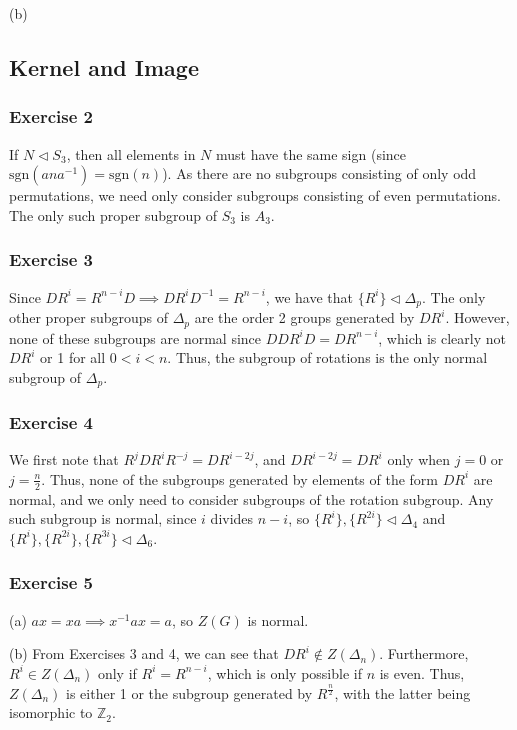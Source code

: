 (b) 

\subsection{Kernel and Image}

\subsubsection{Exercise 2}
If $N \triangleleft S_3$, then all elements in $N$ must have the same sign 
(since $\text{sgn}(ana^{-1}) = \text{sgn}(n)$). As there are no subgroups consisting of only odd 
permutations, we need only consider subgroups consisting of even permutations. The only such proper
subgroup of $S_3$ is $A_3$.

\subsubsection{Exercise 3}
Since $DR^i = R^{n - i}D \implies DR^i D^{-1} = R^{n - i}$, we have that $\{R^i\} \triangleleft \Delta_p$.
The only other proper subgroups of $\Delta_p$ are the order 2 groups generated by $DR^i$. However,
none of these subgroups are normal since $D DR^i D = DR^{n - i}$, which is clearly not
$DR^i$ or 1 for all $0 < i < n$. Thus, the subgroup of rotations is the only normal subgroup of $\Delta_p$.

\subsubsection{Exercise 4}
We first note that $R^j DR^i R^{-j} = DR^{i - 2j}$, and $DR^{i - 2j} = DR^i$ only when $j = 0$ or 
$j = \frac{n}{2}$. Thus, none of the subgroups generated by elements of the form $DR^i$ are normal,
and we only need to consider subgroups of the rotation subgroup. Any such subgroup
is normal, since $i$ divides $n - i$, so $\{R^i\}, \{R^{2i}\} \triangleleft \Delta_4$ and
$\{R^i\}, \{R^{2i}\}, \{R^{3i}\} \triangleleft \Delta_6$.

\subsubsection{Exercise 5}
(a) $ax = xa \implies x^{-1} a x = a$, so $Z(G)$ is normal.

(b) From Exercises 3 and 4, we can see that $DR^i \notin Z(\Delta_n)$. Furthermore, $R^i \in Z(\Delta_n)$
only if $R^i = R^{n - i}$, which is only possible if $n$ is even. Thus, $Z(\Delta_n)$ is either 1 or the
subgroup generated by $R^{\frac{n}{2}}$, with the latter being isomorphic to $\mathbb{Z}_2$.

